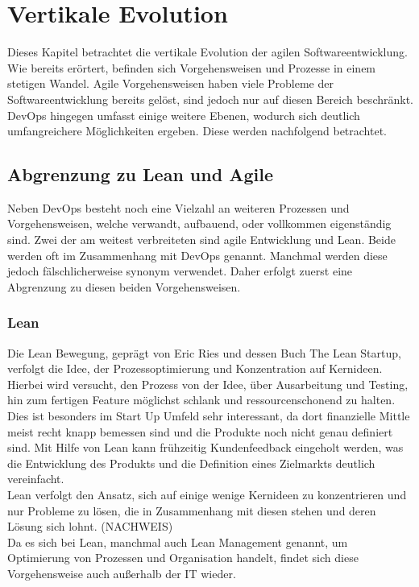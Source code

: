 \chapter{Vertikale Evolution} %
Dieses Kapitel betrachtet die vertikale Evolution der agilen Softwareentwicklung. Wie bereits erörtert, befinden sich Vorgehensweisen und Prozesse in einem stetigen Wandel. Agile Vorgehensweisen haben viele Probleme der Softwareentwicklung bereits gelöst, sind jedoch nur auf diesen Bereich beschränkt. DevOps hingegen umfasst einige weitere Ebenen, wodurch sich deutlich umfangreichere Möglichkeiten ergeben. Diese werden nachfolgend betrachtet.


\section{Abgrenzung zu Lean und Agile} %
Neben DevOps besteht noch eine Vielzahl an weiteren Prozessen und Vorgehensweisen, welche verwandt, aufbauend, oder vollkommen eigenständig sind. Zwei der am weitest verbreiteten sind agile Entwicklung und Lean. Beide werden oft im Zusammenhang mit DevOps genannt. Manchmal werden diese jedoch fälschlicherweise synonym verwendet. Daher erfolgt zuerst eine Abgrenzung zu diesen beiden Vorgehensweisen.

\subsection{Lean}
Die Lean Bewegung, geprägt von Eric Ries und dessen Buch \glqq The Lean Startup\grqq, verfolgt die Idee, der Prozessoptimierung und Konzentration auf Kernideen. Hierbei wird versucht, den Prozess von der Idee, über Ausarbeitung und Testing, hin zum fertigen Feature möglichst schlank und ressourcenschonend zu halten. Dies ist besonders im Start Up Umfeld sehr interessant, da dort finanzielle Mittle meist recht knapp bemessen sind und die Produkte noch nicht genau definiert sind. Mit Hilfe von Lean kann frühzeitig Kundenfeedback eingeholt werden, was die Entwicklung des Produkts und die Definition eines Zielmarkts deutlich vereinfacht.\\
Lean verfolgt den Ansatz, sich auf einige wenige Kernideen zu konzentrieren und nur Probleme zu lösen, die in Zusammenhang mit diesen stehen und deren Lösung sich lohnt. (NACHWEIS) \\
Da es sich bei Lean, manchmal auch Lean Management genannt, um Optimierung von Prozessen und Organisation handelt, findet sich diese Vorgehensweise auch außerhalb der IT wieder.

